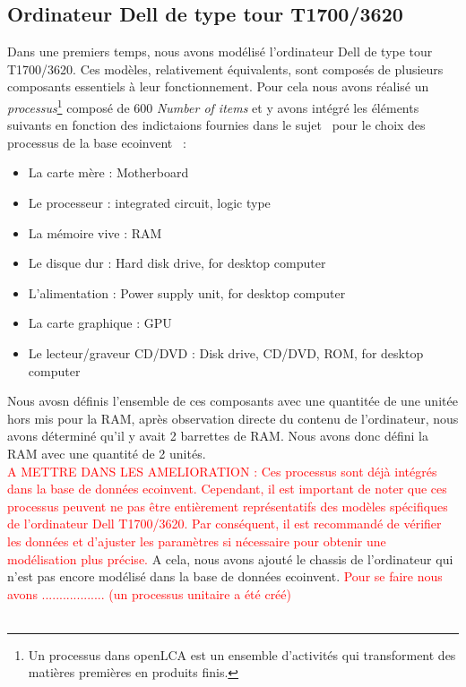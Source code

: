 \documentclass[12pt,a4paper]{paper}
\begin{document}
\subsection{Ordinateur Dell de type tour T1700/3620}
Dans une premiers temps, nous avons modélisé l'ordinateur Dell de type tour T1700/3620. Ces modèles, relativement équivalents, sont composés de plusieurs composants essentiels à leur fonctionnement. Pour cela nous avons réalisé un \textit{processus}\footnote{Un processus dans openLCA est un ensemble d'activités qui transforment des matières premières en produits finis.} composé de 600 \textit{Number of items} et y avons intégré les éléments suivants en fonction des indictaions fournies dans le sujet~\cite{TP2_ACV_ENSEIRB-MATMECA} pour le choix des processus de la base ecoinvent~\cite{ecoinvent2024} :
\begin{itemize}
    \item La carte mère : Motherboard
    \item Le processeur : integrated circuit, logic type
    \item La mémoire vive : RAM
    \item Le disque dur : Hard disk drive, for desktop computer
    \item L'alimentation : Power supply unit, for desktop computer
    \item La carte graphique : GPU
    \item Le lecteur/graveur CD/DVD : Disk drive, CD/DVD, ROM, for desktop computer
\end{itemize}
Nous avosn définis l'ensemble de ces composants avec une quantitée de une unitée hors mis pour la RAM, après observation directe du contenu de l'ordinateur, nous avons déterminé qu'il y avait 2 barrettes de RAM. Nous avons donc défini la RAM avec une quantité de 2 unités.\\
\textcolor{red}{A METTRE DANS LES AMELIORATION : Ces processus sont déjà intégrés dans la base de données ecoinvent. Cependant, il est important de noter que ces processus peuvent ne pas être entièrement représentatifs des modèles spécifiques de l'ordinateur Dell T1700/3620. Par conséquent, il est recommandé de vérifier les données et d'ajuster les paramètres si nécessaire pour obtenir une modélisation plus précise.}
A cela, nous avons ajouté le chassis de l'ordinateur qui n'est pas encore modélisé dans la base de données ecoinvent. \textcolor{red}{Pour se faire nous avons .................. (un processus unitaire a été créé)}\\ \\
\end{document}
